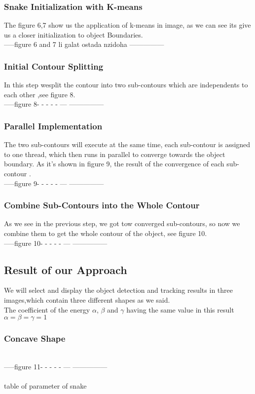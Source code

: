 \subsubsection{Snake Initialization with K-means}
The figure 6,7 show us the application of k-means in image, as we can see its give us a
closer initialization to object Boundaries.\\
-----figure 6 and 7 li galat ostada nzidoha  ---------------\\
\subsubsection{Initial Contour Splitting}
In this step wesplit the contour into two sub-contours which are independents to
each other ,see figure 8.
\\-----figure 8- - - - - ---  ---------------\\
\subsubsection{Parallel Implementation}
The two sub-contours will execute at the same time, each sub-contour is assigned to
one thread, which then runs in parallel to converge towards the object boundary. As
it's shown in figure 9, the result of the convergence of each sub-contour .
\\-----figure 9- - - - - ---  ---------------\\

\subsubsection{Combine Sub-Contours into the Whole Contour}
As we see in the previous step, we got tow converged sub-contours, so now we
combine them to get the whole contour of the object, see figure 10.
\\-----figure 10- - - - - ---  ---------------\\
\subsection{Result of our Approach}\label{subsec:result-of-our-approach}
We will select and display the object detection and tracking results in three
images,which contain three different shapes as we said.\\
The coefficient of the energy $\alpha$, $\beta$ and $\gamma$ having the same value in this result
$\alpha = \beta = \gamma = 1$
\subsubsection{Concave Shape}
\\-----figure 11- - - - - ---  ---------------\\
\\table of parameter of snake \\
